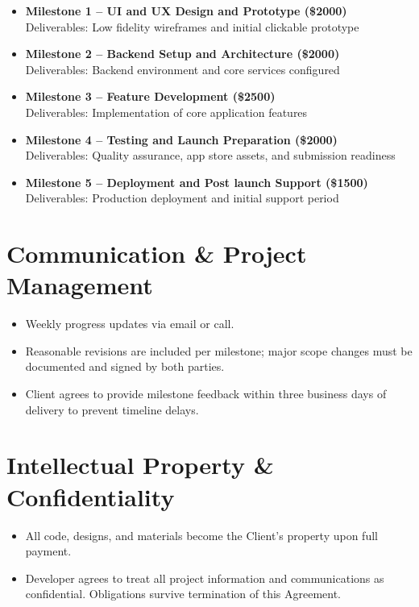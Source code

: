 \documentclass[11pt,letterpaper]{article}
\newcommand{\MilestoneOne}{UI and UX Design and Prototype}
\newcommand{\MOneCost}{2000}
\newcommand{\MOneDeliverables}{Low fidelity wireframes and initial clickable prototype}
\newcommand{\MilestoneTwo}{Backend Setup and Architecture}
\newcommand{\MTwoCost}{2000}
\newcommand{\MTwoDeliverables}{Backend environment and core services configured}
\newcommand{\MilestoneThree}{Feature Development}
\newcommand{\MThreeCost}{2500}
\newcommand{\MThreeDeliverables}{Implementation of core application features}
\newcommand{\MilestoneFour}{Testing and Launch Preparation}
\newcommand{\MFourCost}{2000}
\newcommand{\MFourDeliverables}{Quality assurance, app store assets, and submission readiness}
\newcommand{\MilestoneFive}{Deployment and Post launch Support}
\newcommand{\MFiveCost}{1500}
\newcommand{\MFiveDeliverables}{Production deployment and initial support period}
\begin{document}
\begin{itemize}[leftmargin=*]
\item \textbf{Milestone 1 -- \MilestoneOne{} (\$\MOneCost{})}\\
Deliverables: \MOneDeliverables{}

\item \textbf{Milestone 2 -- \MilestoneTwo{} (\$\MTwoCost{})}\\
Deliverables: \MTwoDeliverables{}

\item \textbf{Milestone 3 -- \MilestoneThree{} (\$\MThreeCost{})}\\
Deliverables: \MThreeDeliverables{}

\item \textbf{Milestone 4 -- \MilestoneFour{} (\$\MFourCost{})}\\
Deliverables: \MFourDeliverables{}

\item \textbf{Milestone 5 -- \MilestoneFive{} (\$\MFiveCost{})}\\
Deliverables: \MFiveDeliverables{}
\end{itemize}

\section{Communication \& Project Management}
\begin{itemize}[leftmargin=*]
\item Weekly progress updates via email or call.
\item Reasonable revisions are included per milestone; major scope changes must be documented and signed by both parties.
\item Client agrees to provide milestone feedback within three business days of delivery to prevent timeline delays.
\end{itemize}

\section{Intellectual Property \& Confidentiality}
\begin{itemize}[leftmargin=*]
\item All code, designs, and materials become the Client's property upon full payment.
\item Developer agrees to treat all project information and communications as confidential. Obligations survive termination of this Agreement.
\end{itemize}
\end{document}
